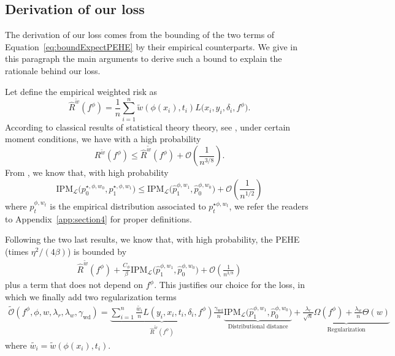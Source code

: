 \documentclass[12pt]{article}
\theoremstyle{plain}
\theoremstyle{definition}
\theoremstyle{remark}
\begin{document}
\subsection{Derivation of our loss}\label{derivloss}
The derivation of our loss comes from the bounding of the two terms of Equation~\eqref{eq:boundExpectPEHE} by their empirical counterparts. We give in this paragraph the main arguments to derive such a bound to explain the rationale behind our loss.

Let define the empirical weighted risk as
 \begin{equation*}
   \widehat{R}^{\tilde{w}}(f^\phi)=  \frac{1}{n}\sum ^{n}_{i=1} \tilde{w}( \phi(x_{i}) ,t_{i})L\Big(x_i, y_i, \delta_i, f^\phi\Big).
 \end{equation*}
According to classical results of statistical theory theory, see \cite{vapnik1999nature,Cortes2010LearningWeighting}, under certain moment conditions, we have with a high probability
\begin{equation*}
    R^{\tilde{w}}(f^\phi) \leq \widehat{R}^{\tilde{w}}(f^\phi) + \mathcal{O}(\frac{1}{n^{3/8}}).
\end{equation*}
From \cite{Sriperumbudur2009OnIP}, we know that, with high probability
\begin{equation*}
\text{IPM}_{\mathcal{L}}\Big(  p^{\star,\phi,w_0}_{0}, p^{\star,\phi,w_1}_{1}\Big) \leq \text{IPM}_{\mathcal{L}}\Big(\hat{p}^{\phi,w_{1}}_{1} ,\hat{p}^{\phi,w_{0}}_{0}\Big) + \mathcal{O}(\frac{1}{n^{1/2}})
\end{equation*}
where $\hat{p}^{\phi,w_{t}}_{t}$ is the empirical distribution associated to $p^{\star\phi,w_{t}}_{t}$, we refer the readers to Appendix~\ref{app:section4} for proper definitions.


Following the two last results, we know that, with high probability, the PEHE (times $\eta^2/(4\beta)$) is bounded by
\begin{align*}
 \widehat{R}^{\tilde{w}}(f^\phi) + \frac{C_{\phi}}{\beta} \text{IPM}_{\mathcal{L}}\Big(\hat{p}^{\phi,w_{1}}_{1} ,\hat{p}^{\phi,w_{0}}_{0}\Big) +\mathcal{O}(\frac{1}{n^{3/8}})   
\end{align*}plus a term that does not depend on $f^\phi$. This justifies our choice for the loss, in which we finally add two regularization terms
\begin{align*} \label{eqn:obj_loss}
    \mathcal{\tilde{O}}(f^\phi,\phi,w,\lambda_r,\lambda_w,\gamma_{\text{wd}})=\underbrace{\sum_{i=1}^n \frac{\tilde{w_{i}}}{n} L(y_i,x_i,t_i,\delta_i,f^\phi) }_{\hat{R}^{\tilde{w}}(f^\phi)} \frac{\gamma_{\text{wd}}}{n}  \underbrace{\text{IPM}_{\mathcal{L}}\Big(\hat{p}^{\phi,w_{1}}_{1} ,\hat{p}^{\phi,w_{0}}_{0}\Big)}_{\text{Distributional distance}}  + \underbrace{\frac{\lambda_r}{\sqrt{n}}\Omega(f^\phi)+ \frac{\lambda_w}{n} \Theta(w) }_{\text{Regularization}} 
\end{align*}
where $\tilde{w_{i}}=\tilde{w}(\phi(x_i),t_i)$. 
\end{document}
